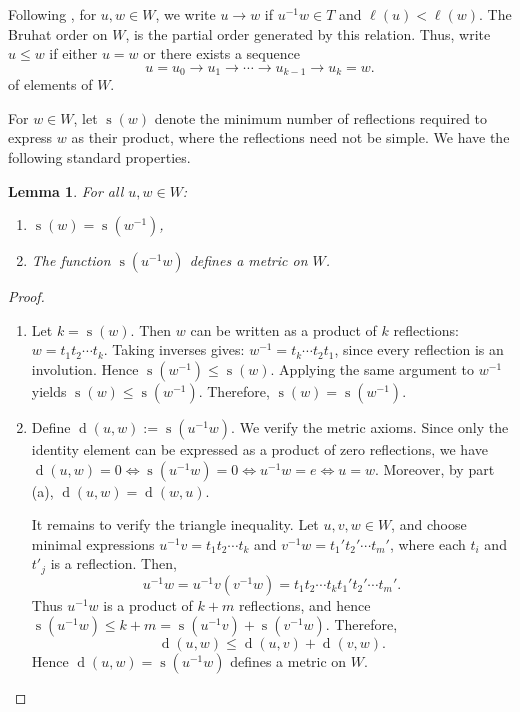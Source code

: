 \documentclass[11pt]{article}
\newtheorem{lemma}[equation]{Lemma}
\theoremstyle{definition}
\numberwithin{equation}{section}
\DeclareMathOperator{\de}{\mathrm{d}}
\DeclareMathOperator{\si}{\mathrm{s}}
\begin{document}
	Following \cite[Definition 2.1.1 ]{BB05}, for $u,w\in W$, we write $u\to w$ if $u^{-1}w\in T$ and $\ell(u)< \ell(w)$. The Bruhat order  on $W$, is the partial order generated by this relation. Thus, write $u\le w$ if either $u= w$ or there exists a sequence
	$$u= u_0\to u_1\to \cdots\to u_{k-1}\to u_k= w.$$ 
	of elements of $W$. 
	
		
	For $w\in W$, let $\si(w)$ denote the minimum number of reflections required to express $w$ as their product, where the reflections need not be simple. We have the following standard properties. 
	\begin{lemma}\label{metriconw} For all $u, w\in W$:
		\begin{enumerate}
			\item[(a)] $\si(w)= \si(w^{-1})$,
			\item[(b)] The function $\si(u^{-1}w)$ defines a metric on $W$. 
		\end{enumerate}
	\end{lemma}
	\begin{proof}
		\begin{enumerate}
			\item[(a)] Let $k= \si(w)$. Then $w$ can be written as a product of $k$ reflections: $w= t_1t_2\cdots t_k$. Taking inverses gives: $w^{-1}= t_k\cdots t_2t_1$, since every reflection is an involution. Hence $\si(w^{-1})\le\si(w)$. Applying the same argument to $w^{-1}$ yields $\si(w)\le\si(w^{-1})$. Therefore, $\si(w)= \si(w^{-1})$. 
			\item[(b)] Define $\de(u, w):= \si(u^{-1}w)$. We verify the metric axioms. Since only the identity element can be expressed as a product of zero reflections, we have $\de(u, w)= 0\iff \si(u^{-1}w)= 0 \iff u^{-1}w= e\iff u= w$. Moreover, by part (a), $\de(u,w)= \de(w, u)$.
			
			It remains to verify the triangle inequality. Let $u, v, w\in W$, and choose minimal expressions $u^{-1}v= t_1t_2\cdots t_k$ and $v^{-1}w= t_1't_2'\cdots t_m'$, where each $t_i$ and $t'_{j}$ is a reflection. Then, $$u^{-1}w= u^{-1}v(v^{-1}w)= t_1t_2\cdots t_kt_1't_2'\cdots t_m'.$$ 
			Thus $u^{-1}w$ is a product of $k+ m$ reflections, and hence $\si(u^{-1}w)\leq k+ m= \si(u^{-1}v)+ \si(v^{-1}w)$. Therefore, 
			$$\de(u, w)\leq \de(u,v)+ \de(v, w).$$
			Hence $\de(u,w)= \si(u^{-1}w)$ defines a metric on $W$. 
		\end{enumerate}
	\end{proof}
	
\end{document}
